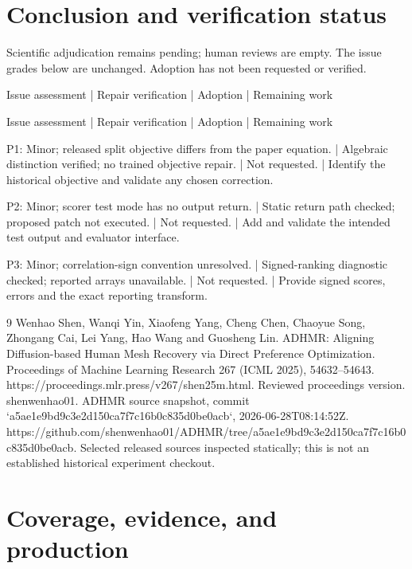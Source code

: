 \documentclass[10pt]{article}
\begin{document}
\section*{Conclusion and verification status}
Scientific adjudication remains pending; human reviews are empty. The issue grades below are unchanged. Adoption has not been requested or verified.\par
Issue assessment | Repair verification | Adoption | Remaining work\par
Issue assessment | Repair verification | Adoption | Remaining work\par
P1: Minor; released split objective differs from the paper equation. | Algebraic distinction verified; no trained objective repair. | Not requested. | Identify the historical objective and validate any chosen correction.\par
P2: Minor; scorer test mode has no output return. | Static return path checked; proposed patch not executed. | Not requested. | Add and validate the intended test output and evaluator interface.\par
P3: Minor; correlation-sign convention unresolved. | Signed-ranking diagnostic checked; reported arrays unavailable. | Not requested. | Provide signed scores, errors and the exact reporting transform.\par
9 Wenhao Shen, Wanqi Yin, Xiaofeng Yang, Cheng Chen, Chaoyue Song, Zhongang Cai, Lei Yang, Hao Wang and Guosheng Lin. ADHMR: Aligning Diffusion-based Human Mesh Recovery via Direct Preference Optimization. Proceedings of Machine Learning Research 267 (ICML 2025), 54632–54643. https://proceedings.mlr.press/v267/shen25m.html. Reviewed proceedings version. shenwenhao01. ADHMR source snapshot, commit `a5ae1e9bd9c3e2d150ca7f7c16b0c835d0be0acb`, 2026-06-28T08:14:52Z. https://github.com/shenwenhao01/ADHMR/tree/a5ae1e9bd9c3e2d150ca7f7c16b0c835d0be0acb. Selected released sources inspected statically; this is not an established historical experiment checkout.\par
\section*{Coverage, evidence, and production}
\end{document}
